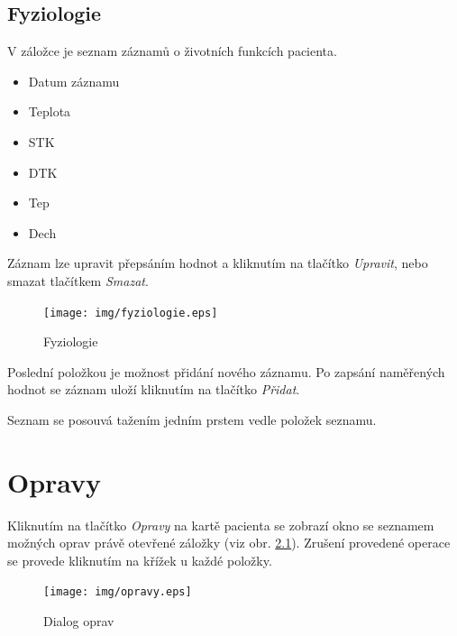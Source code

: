 \section{Fyziologie}

V záložce je seznam záznamů o životních funkcích pacienta.

\begin{itemize}
	\item Datum záznamu
	\item Teplota
	\item STK
	\item DTK
	\item Tep
	\item Dech
\end{itemize}

Záznam lze upravit přepsáním hodnot a kliknutím na tlačítko \emph{Upravit}, nebo smazat tlačítkem \emph{Smazat}.

\begin{figure}[H]
	\centering
	\texttt{[image: img/fyziologie.eps]}
	\caption{Fyziologie}
  \label{fig:fyziologie}
\end{figure}

Poslední položkou je možnost přidání nového záznamu. Po zapsání naměřených hodnot se záznam uloží kliknutím na tlačítko \emph{Přidat}.

Seznam se posouvá tažením jedním prstem vedle položek seznamu.


\chapter{Opravy}
\label{ch:opravy}

Kliknutím na tlačítko \emph{Opravy} na kartě pacienta se zobrazí okno se seznamem možných oprav právě otevřené záložky (viz obr. \ref{fig:opravy}). Zrušení provedené operace se provede kliknutím na křížek u každé položky.

\begin{figure}[H]
	\centering
	\texttt{[image: img/opravy.eps]}
	\caption{Dialog oprav}
  \label{fig:opravy}
\end{figure}

